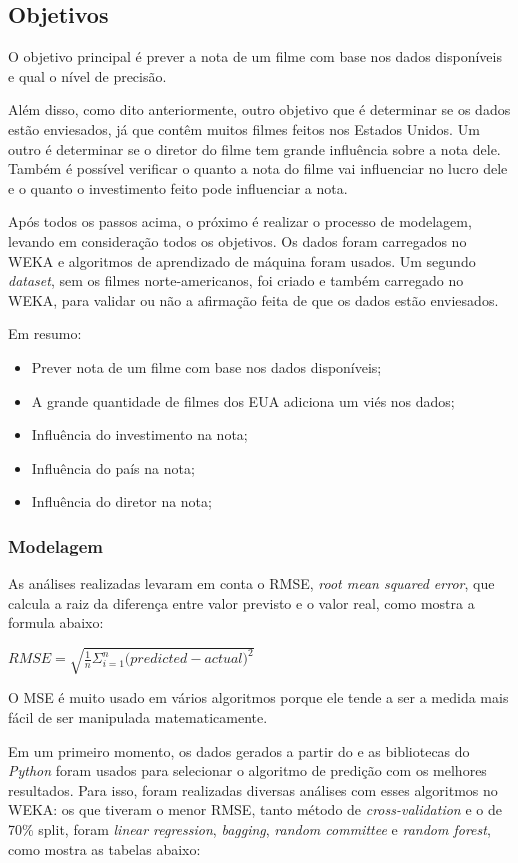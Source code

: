 \subsection{Objetivos}
O objetivo principal é prever a nota de um filme com base nos dados disponíveis e qual o nível de precisão.

Além disso, como dito anteriormente, outro objetivo que é determinar se os dados estão enviesados, já que contêm muitos filmes feitos nos Estados Unidos. Um outro é determinar se o diretor do filme tem grande influência sobre a nota dele. Também é possível verificar o quanto a nota do filme vai influenciar no lucro dele e o quanto o investimento feito pode influenciar a nota.

Após todos os passos acima, o próximo é realizar o processo de modelagem, levando em consideração todos os objetivos. Os dados foram carregados no WEKA e algoritmos de aprendizado de máquina foram usados. Um segundo \textit{dataset}, sem os filmes norte-americanos, foi criado e também carregado no WEKA, para validar ou não a afirmação feita de que os dados estão enviesados. 

Em resumo:

\begin{itemize}
    \item Prever nota de um filme com base nos dados disponíveis;
    \item A grande quantidade de filmes dos EUA adiciona um viés nos dados;
    \item Influência do investimento na nota;
    \item Influência do país na nota;
    \item Influência do diretor na nota;
\end{itemize}

\subsubsection{Modelagem}
As análises realizadas levaram em conta o RMSE, \textit{root mean squared error}, que calcula a raiz da diferença entre valor previsto e o valor real, como mostra a formula abaixo:

$RMSE = \sqrt{\frac{1}{n}\Sigma_{i=1}^{n}{\Big({predicted-actual}\Big)^2}}$
 
O MSE é muito usado em vários algoritmos porque ele tende a ser a medida mais fácil de ser manipulada matematicamente.

Em um primeiro momento, os dados gerados a partir do \pdi e as bibliotecas do \textit{Python} foram usados para selecionar o algoritmo de predição com os melhores resultados. Para isso, foram realizadas diversas análises com esses algoritmos no WEKA: os que tiveram o menor RMSE, tanto método de \textit{cross-validation} e o de 70\% split, foram \textit{linear regression}, \textit{bagging}, \textit{random committee} e \textit{random forest}, como mostra as tabelas abaixo:


